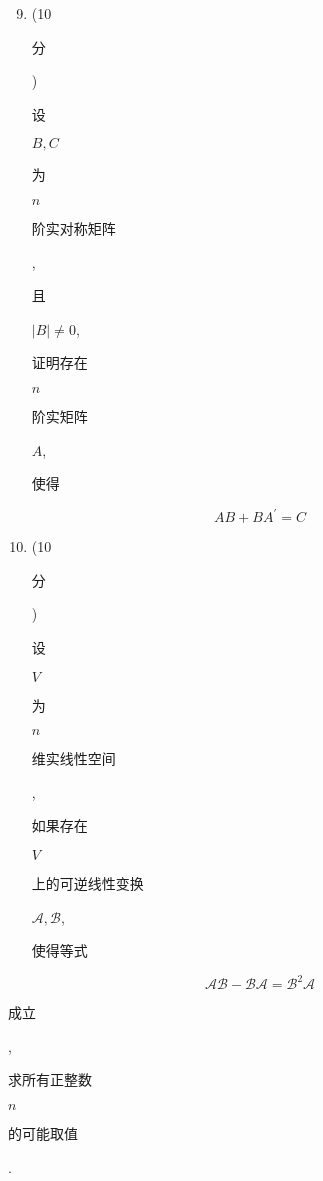 \documentclass[10pt]{article}
\begin{document}
\begin{enumerate}
  \setcounter{enumi}{8}
  \item (10 \begin{CJK}{UTF8}{mj}分\end{CJK}) \begin{CJK}{UTF8}{mj}设\end{CJK} $B, C$ \begin{CJK}{UTF8}{mj}为\end{CJK} $n$ \begin{CJK}{UTF8}{mj}阶实对称矩阵\end{CJK}, \begin{CJK}{UTF8}{mj}且\end{CJK} $|B| \neq 0$, \begin{CJK}{UTF8}{mj}证明存在\end{CJK} $n$ \begin{CJK}{UTF8}{mj}阶实矩阵\end{CJK} $A$, \begin{CJK}{UTF8}{mj}使得\end{CJK}
\end{enumerate}
$$
A B+B A^{\prime}=C
$$

\begin{enumerate}
  \setcounter{enumi}{9}
  \item (10 \begin{CJK}{UTF8}{mj}分\end{CJK}) \begin{CJK}{UTF8}{mj}设\end{CJK} $V$ \begin{CJK}{UTF8}{mj}为\end{CJK} $n$ \begin{CJK}{UTF8}{mj}维实线性空间\end{CJK}, \begin{CJK}{UTF8}{mj}如果存在\end{CJK} $V$ \begin{CJK}{UTF8}{mj}上的可逆线性变换\end{CJK} $\mathscr{A}, \mathscr{B}$, \begin{CJK}{UTF8}{mj}使得等式\end{CJK}
\end{enumerate}
$$
\mathscr{A} \mathscr{B}-\mathscr{B} \mathscr{A}=\mathscr{B}^{2} \mathscr{A}
$$
\begin{CJK}{UTF8}{mj}成立\end{CJK}, \begin{CJK}{UTF8}{mj}求所有正整数\end{CJK} $n$ \begin{CJK}{UTF8}{mj}的可能取值\end{CJK}.
\end{document}
